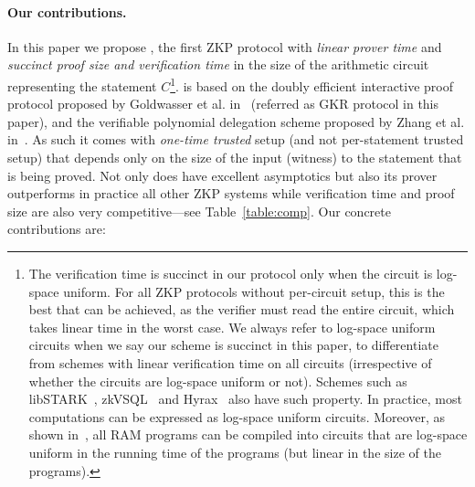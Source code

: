 \paragraph{Our contributions.} In this paper we propose \name, the first ZKP protocol with \emph{linear prover time} and \emph{succinct proof size and verification time} in the size of the arithmetic circuit representing the statement $C$\footnote{The verification time is succinct in our protocol only when the circuit is log-space uniform. For all ZKP protocols without per-circuit setup, this is the best that can be achieved, as the verifier must read the entire circuit, which takes linear time in the worst case. We always refer to log-space uniform circuits when we say our scheme is succinct in this paper, to differentiate from schemes with linear verification time on all circuits (irrespective of whether the circuits are log-space uniform or not). Schemes such as \textsf{libSTARK}~\cite{libstark}, \textsf{zkVSQL}~\cite{zkvpd} and \textsf{Hyrax}~\cite{hyrax} also have such property. In practice, most computations can be expressed as log-space uniform circuits. Moreover, as shown in~\cite{libsnark,vram,libstark}, all RAM programs  can be compiled into circuits that are log-space uniform in the running time of the programs (but linear in the size of the programs).}. \name is based on the doubly efficient interactive proof protocol proposed by Goldwasser et al. in~\cite{GKR} (referred as GKR protocol in this paper), and the verifiable polynomial delegation scheme proposed by Zhang et al. in~\cite{zhang2017vsql}. As such it comes with \emph{one-time trusted} setup (and not per-statement trusted setup) that depends only on the size of the input (witness) to the statement that is being proved. Not only does \name have excellent asymptotics but also its prover outperforms in practice all other ZKP systems while verification time and proof size are also very competitive---see Table~\ref{table:comp}. Our concrete contributions are:
